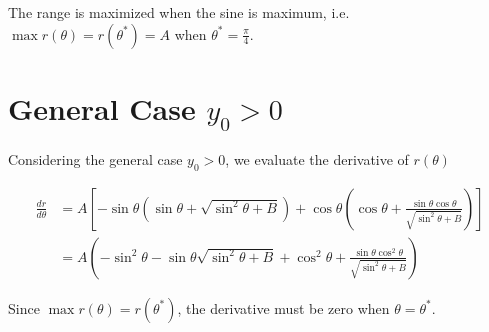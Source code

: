 \documentclass[a4paper,10pt]{article}
\begin{document}
The range is maximized when the sine is maximum,
i.e. $\max r(\theta) = r(\theta^*) = A$ when $\theta^* = \frac{\pi}{4}$.

\section{General Case $y_0>0$}

Considering the general case $y_0>0$,
we evaluate the derivative of $r(\theta)$

\begin{equation}
    \begin{aligned}
        \frac{dr}{d\theta} & = A\left[
            -\sin\theta\left(
                \sin\theta
                + \sqrt{
                    \sin^2\theta
                    + B
                }
            \right)
            + \cos\theta\left(
                \cos\theta
                + \frac{
                    \sin\theta\cos\theta
                }{
                    \sqrt{
                        \sin^2\theta
                        + B
                    }
                }
            \right)
        \right]\\
        & = A\left(
            -\sin^2\theta
            - \sin\theta\sqrt{
                \sin^2\theta
                + B
            }
            + \cos^2\theta
            + \frac{
                \sin\theta\cos^2\theta
            }{
                \sqrt{
                    \sin^2\theta
                    + B
                }
            }
        \right)
    \end{aligned}
\end{equation}

Since $\max r(\theta) = r(\theta^*)$,
the derivative must be zero when $\theta=\theta^*$.
\end{document}

